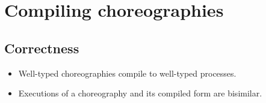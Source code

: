 \section{Compiling choreographies}\label{sec:compile-choreo}

\subsection{Correctness}\label{sec:correctness}

\begin{itemize}
\item Well-typed choreographies compile to well-typed processes.
\item Executions of a choreography and its compiled form are bisimilar.
\end{itemize}

